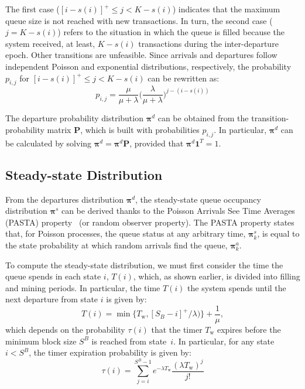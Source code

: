 \documentclass[conference]{IEEEtran}
\theoremstyle{definition}
\begin{document}
The first case ($[i - s(i)]^+ \leq j < K - s(i)$) indicates that the maximum queue size is not reached with new transactions. In turn, the second case ($j = K - s(i)$) refers to the situation in which the queue is filled because the system received, at least, $K - s(i)$ transactions during the inter-departure epoch. Other transitions are unfeasible. Since arrivals and departures follow independent Poisson and exponential distributions, respectively, the probability $p_{i,j}$ for $[i - s(i)]^+ \leq j < K - s(i)$ can be rewritten as:
\begin{equation}
    p_{i,j} = \frac{\mu}{\mu + \lambda} \Big(\frac{\lambda}{\mu + \lambda}\Big)^{j-(i-s(i))}
    \label{eq:pij}
\end{equation}

The departure probability distribution $\boldsymbol{\pi}^d$ can be obtained from the transition-probability matrix $\boldsymbol{\text{P}}$, which is built with probabilities $p_{i,j}$. In particular, $\boldsymbol{\pi}^d$ can be calculated by solving $\boldsymbol{\pi}^d = \boldsymbol{\pi}^d \boldsymbol{\text{P}}$, provided that $\boldsymbol{\pi}^d \boldsymbol{1}^T = 1$. 

\subsection{Steady-state Distribution}
From the departures distribution $\boldsymbol{\pi}^d$, the steady-state queue occupancy distribution $\boldsymbol{\pi}^s$ can be derived thanks to the Poisson Arrivals See Time Averages (PASTA) property~\cite{gross1998fundamentals} (or random observer property). The PASTA property states that, for Poisson processes, the queue status at any arbitrary time, $\boldsymbol{\pi}^s_k$, is equal to the state probability at which random arrivals find the queue, $\boldsymbol{\pi}^a_k$. 

To compute the steady-state distribution, we must first consider the time the queue spends in each state $i$, $T(i)$, which, as shown earlier, is divided into filling and mining periods. In particular, the time $T(i)$ the system spends until the next departure from state $i$ is given by:
\begin{equation}
    T(i) = \min \{ T_\text{w}, [S_B - i]^+/\lambda \big)\} + \frac{1}{\mu},
\end{equation}
which depends on the probability $\tau(i)$ that the timer $T_\text{w}$ expires before the minimum block size $S^B$ is reached from state~$i$. In particular, for any state $i<S^B$, the timer expiration probability is given by: %
\begin{equation} 
    \tau(i) = \sum_{j=i}^{S^B-1}  e^{-\lambda T_\text{w}} \frac{(\lambda T_\text{w})^j}{j!}
\end{equation}
\end{document}
